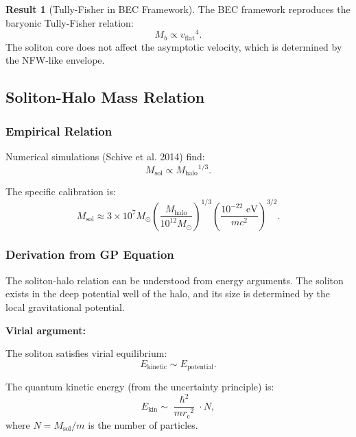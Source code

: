 \documentclass[11pt,a4paper]{article}
\newcommand{\hbar}{\ensuremath{\hslash}}
\newcommand{\Msun}{\ensuremath{M_{\odot}}}
\newcommand{\Msol}{\ensuremath{M_{\mathrm{sol}}}}
\newcommand{\Mhalo}{\ensuremath{M_{\mathrm{halo}}}}
\newcommand{\rc}{\ensuremath{r_{\mathrm{c}}}}
\newcommand{\vflat}{\ensuremath{v_{\mathrm{flat}}}}
\theoremstyle{definition}
\newtheorem{result}{Result}
\theoremstyle{remark}
\begin{document}
\begin{result}[Tully-Fisher in BEC Framework]
The BEC framework reproduces the baryonic Tully-Fisher relation:
\begin{equation}
\boxed{M_b \propto \vflat^4.}
\end{equation}
The soliton core does not affect the asymptotic velocity, which is determined by the NFW-like envelope.
\end{result}

\subsection{Soliton-Halo Mass Relation}
\label{sec:soliton_halo}

\subsubsection{Empirical Relation}

Numerical simulations (Schive et al. 2014) find:
\begin{equation}
\label{eq:soliton_halo}
\boxed{\Msol \propto \Mhalo^{1/3}.}
\end{equation}

The specific calibration is:
\begin{equation}
\Msol \approx 3 \times 10^7 \Msun \left(\frac{\Mhalo}{10^{12} \Msun}\right)^{1/3} \left(\frac{10^{-22}\text{ eV}}{mc^2}\right)^{3/2}.
\end{equation}

\subsubsection{Derivation from GP Equation}

The soliton-halo relation can be understood from energy arguments. The soliton exists in the deep potential well of the halo, and its size is determined by the local gravitational potential.

\textbf{Virial argument:}

The soliton satisfies virial equilibrium:
\begin{equation}
E_{\mathrm{kinetic}} \sim E_{\mathrm{potential}}.
\end{equation}

The quantum kinetic energy (from the uncertainty principle) is:
\begin{equation}
E_{\mathrm{kin}} \sim \frac{\hbar^2}{m \rc^2} \cdot N,
\end{equation}
where $N = \Msol/m$ is the number of particles.
\end{document}
